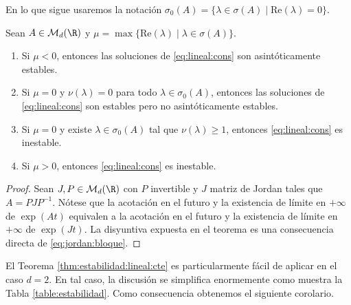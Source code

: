 En lo que sigue usaremos la notación
$\sigma_0(A) = \{\lambda \in \sigma(A) \mid \mathrm{Re}(\lambda) = 0\}$.

\begin{theorem}\label{thm:estabilidad:lineal:cte}
  Sean $A \in \mathcal{M}_d(\R)$ y $\mu = \max \{\mathrm{Re}(\lambda) \mid \lambda \in \sigma(A)\}$.
  \begin{enumerate}
  \item Si $\mu < 0$, entonces las soluciones de \eqref{eq:lineal:cons} son asintóticamente
    estables.
  \item Si $\mu = 0$ y $\nu(\lambda) = 0$ para todo $\lambda \in \sigma_0(A)$, entonces las
    soluciones de \eqref{eq:lineal:cons} son estables pero no asintóticamente estables.
  \item Si $\mu = 0$ y existe $\lambda \in \sigma_0(A)$ tal que $\nu(\lambda) \ge 1$, entonces
    \eqref{eq:lineal:cons} es inestable.
  \item Si $\mu > 0$, entonces \eqref{eq:lineal:cons} es inestable.
  \end{enumerate}
\end{theorem}
\begin{proof}
  Sean $J, P \in \mathcal{M}_d(\R)$ con $P$ invertible y $J$ matriz de Jordan tales que
  $A = P J P^{-1}$. Nótese que la acotación en el futuro y la existencia de límite en $+\infty$ de
  $\exp(A t)$ equivalen a la acotación en el futuro y la existencia de límite en $+\infty$ de
  $\exp(J t)$. La disyuntiva expuesta en el teorema es una consecuencia directa de
  \eqref{eq:jordan:bloque}.
\end{proof}


El Teorema \ref{thm:estabilidad:lineal:cte} es particularmente fácil de aplicar en el caso $d =
2$. En tal caso, la discusión se simplifica enormemente como muestra la Tabla
\ref{table:estabilidad}. Como consecuencia obtenemos el siguiente corolario.

